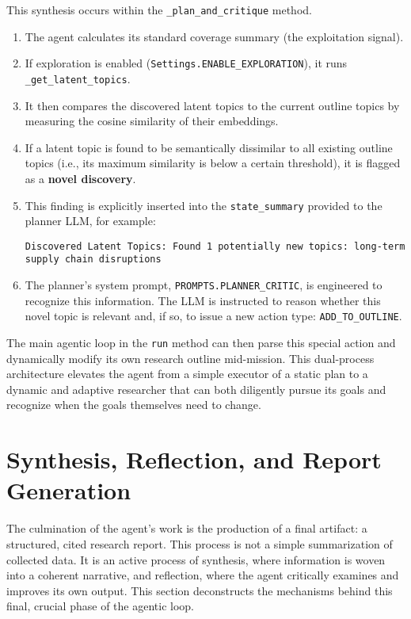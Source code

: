 \documentclass[12pt, a4paper]{article}
\begin{document}
This synthesis occurs within the \verb|_plan_and_critique| method.
\begin{enumerate}
    \item The agent calculates its standard coverage summary (the exploitation signal).
    \item If exploration is enabled (\verb|Settings.ENABLE_EXPLORATION|), it runs \verb|_get_latent_topics|.
    \item It then compares the discovered latent topics to the current outline topics by measuring the cosine similarity of their embeddings.
    \item If a latent topic is found to be semantically dissimilar to all existing outline topics (i.e., its maximum similarity is below a certain threshold), it is flagged as a \textbf{novel discovery}.
    \item This finding is explicitly inserted into the \verb|state_summary| provided to the planner LLM, for example:
    \begin{verbatim}
Discovered Latent Topics: Found 1 potentially new topics: long-term supply chain disruptions
    \end{verbatim}
    \item The planner's system prompt, \verb|PROMPTS.PLANNER_CRITIC|, is engineered to recognize this information. The LLM is instructed to reason whether this novel topic is relevant and, if so, to issue a new action type: \verb|ADD_TO_OUTLINE|.
\end{enumerate}

The main agentic loop in the \verb|run| method can then parse this special action and dynamically modify its own research outline mid-mission. This dual-process architecture elevates the agent from a simple executor of a static plan to a dynamic and adaptive researcher that can both diligently pursue its goals and recognize when the goals themselves need to change.



\section{Synthesis, Reflection, and Report Generation}
The culmination of the agent's work is the production of a final artifact: a structured, cited research report. This process is not a simple summarization of collected data. It is an active process of synthesis, where information is woven into a coherent narrative, and reflection, where the agent critically examines and improves its own output. This section deconstructs the mechanisms behind this final, crucial phase of the agentic loop.
\end{document}
